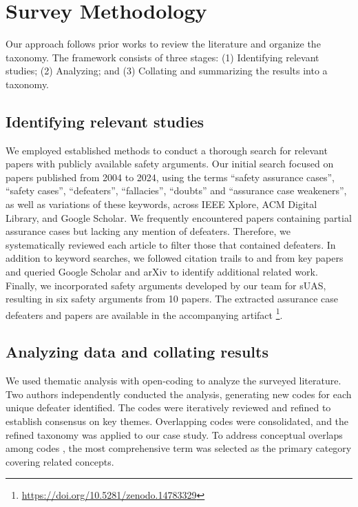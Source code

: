 \section{Survey Methodology}
\label{sec:methodology}

Our approach follows prior works \cite{10.1145/3510003.3510057,shelby2023sociotechnical,gohar2024long} to review the literature and organize the taxonomy. The framework consists of three stages: (1) Identifying relevant studies; (2) Analyzing; and (3) Collating and summarizing the results into a taxonomy. 

\subsection{Identifying relevant studies}

We employed established methods \cite{greenwell2006taxonomy,shelby2023sociotechnical} to conduct a thorough search for relevant papers with publicly available safety arguments. Our initial search focused on papers published from 2004 to 2024, using the terms ``safety assurance cases'', ``safety cases'', ``defeaters'', ``fallacies'', ``doubts'' and ``assurance case weakeners'', as well as variations of these keywords, across IEEE Xplore, ACM Digital Library, and Google Scholar. We frequently encountered papers containing partial assurance cases but lacking any mention of defeaters. Therefore, we systematically reviewed each article to filter those that contained defeaters. In addition to keyword searches, we followed citation trails to and from key papers and queried Google Scholar and arXiv to identify additional related work. Finally, we incorporated safety arguments developed by our team for sUAS, resulting in six safety arguments from 10 papers. The extracted assurance case defeaters and papers are available in the accompanying artifact \footnote{\url{https://doi.org/10.5281/zenodo.14783329}}.


\subsection{Analyzing data and collating results} We used thematic analysis \cite{Clarke2014} with open-coding \cite{miles1994qualitative,gohar2024towards} to analyze the surveyed literature. Two authors independently conducted the analysis, generating new codes for each unique defeater identified. The codes were iteratively reviewed and refined to establish consensus on key themes. Overlapping codes were consolidated, and the refined taxonomy was applied to our case study. To address conceptual overlaps among codes \cite{DBLP:journals/tse/ChillaregeBCHMRW92,shelby2023sociotechnical}, the most comprehensive term was selected as the primary category covering related concepts.


